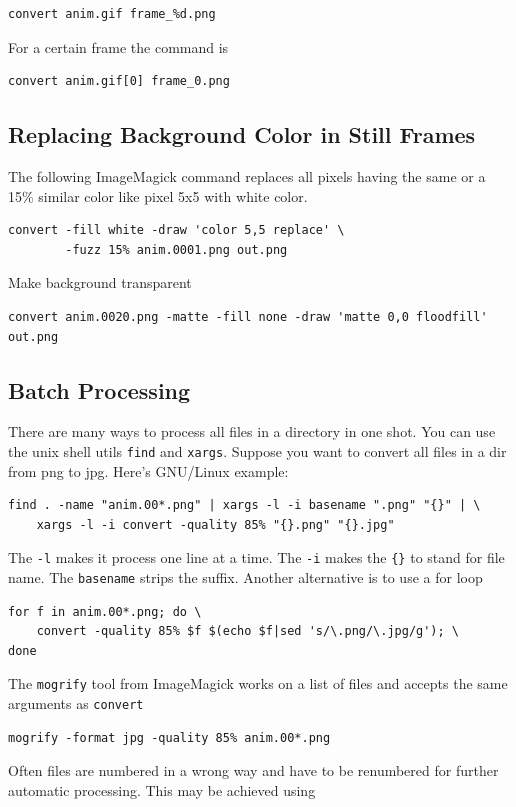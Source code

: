 \begin{verbatim}
convert anim.gif frame_%d.png 
\end{verbatim}%
%
For a certain frame the command is
\begin{verbatim}
convert anim.gif[0] frame_0.png 
\end{verbatim}

\subsection{Replacing Background Color in Still Frames}

The following  ImageMagick command  replaces all pixels  having the same  or a
15\% similar color like pixel 5x5 with white color.
 
\begin{verbatim}
convert -fill white -draw 'color 5,5 replace' \
        -fuzz 15% anim.0001.png out.png
\end{verbatim}%
%
Make background transparent
\begin{verbatim}
convert anim.0020.png -matte -fill none -draw 'matte 0,0 floodfill' out.png
\end{verbatim}

\subsection{Batch Processing}

There are many ways  to process all files in a directory  in one shot. You can
use the unix  shell utils \texttt{find} and \texttt{xargs}.   Suppose you want
to convert all files in a dir from png to jpg.  Here's GNU/Linux example:

\begin{verbatim}
find . -name "anim.00*.png" | xargs -l -i basename ".png" "{}" | \
    xargs -l -i convert -quality 85% "{}.png" "{}.jpg"
\end{verbatim}%
%
The \texttt{-l} makes it process one line at a time. The \texttt{-i} makes the
\texttt{\{\}}  to  stand  for  file  name. The  \texttt{basename}  strips  the
suffix.%
%
Another alternative is to use a for loop
\begin{verbatim}
for f in anim.00*.png; do \
    convert -quality 85% $f $(echo $f|sed 's/\.png/\.jpg/g'); \
done
\end{verbatim}%
%
The  \texttt{mogrify} tool  from  ImageMagick works  on  a list  of files  and
accepts the same arguments as \texttt{convert}
\begin{verbatim}
mogrify -format jpg -quality 85% anim.00*.png
\end{verbatim}%
%
Often files are numbered in a wrong  way and have to be renumbered for further
automatic processing. This may be achieved using

